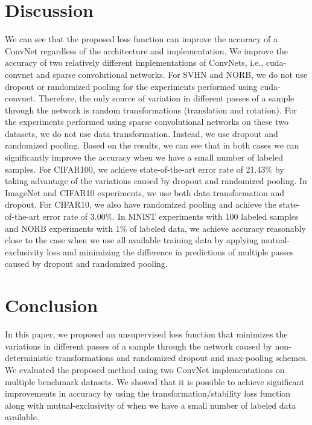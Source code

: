 \documentclass{article}
\begin{document}
\section{Discussion}
\vspace{-0.1cm}
We can see that the proposed loss function can improve the accuracy of a ConvNet regardless of the architecture and implementation. We improve the accuracy of two relatively different implementations of ConvNets, i.e., cuda-convnet and sparse convolutional networks. For SVHN and NORB, we do not use dropout or randomized pooling for the experiments performed using cuda-convnet. Therefore, the only source of variation in different passes of a sample through the network is random transformations (translation and rotation). For the experiments performed using sparse convolutional networks on these two datasets, we do not use data transformation. Instead, we use dropout and randomized pooling. Based on the results, we can see that in both cases we can significantly improve the accuracy when we have a small number of labeled samples. For CIFAR100, we achieve state-of-the-art error rate of 21.43\% by taking advantage of the variations caused by dropout and randomized pooling. In ImageNet and CIFAR10 experiments, we use both data transformation and dropout. For CIFAR10, we also have randomized pooling and achieve the state-of-the-art error rate  of 3.00\%. In MNIST experiments with 100 labeled samples and NORB experiments with 1\% of labeled data, we achieve accuracy reasonably close to the case when we use all available training data by applying mutual-exclusivity loss and minimizing the difference in predictions of multiple passes caused by dropout and randomized pooling.
\vspace{-0.2cm}
\section{Conclusion}
\vspace{-0.1cm}
In this paper, we proposed an unsupervised loss function that minimizes the variations in different passes of a sample through the network caused by non-deterministic transformations and randomized dropout and max-pooling schemes. We evaluated the proposed method using two ConvNet implementations on multiple benchmark datasets. We showed that it is possible to achieve significant improvements in accuracy by using the transformation/stability loss function along with mutual-exclusivity of \cite{mutualexclusive} when we have a small number of labeled data available.

{\small


}
\end{document}
